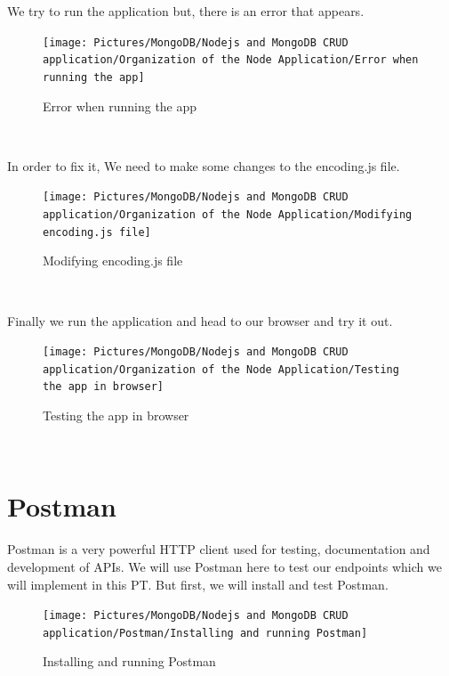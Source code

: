 \begin{spacing}{1.2}
\par We try to run the application but, there is an error that appears.
\\
\begin{figure}[!htb] 
\begin{center} 
\texttt{[image: Pictures/MongoDB/Nodejs and MongoDB CRUD  application/Organization of the Node Application/Error when running the app]} 
\end{center} 
\caption{Error when running the app} 
\end{figure}  \FloatBarrier
\\
\newpage
\par In order to fix it, We need to make some changes to the encoding.js file.
\\
\begin{figure}[!htb] 
\begin{center} 
\texttt{[image: Pictures/MongoDB/Nodejs and MongoDB CRUD  application/Organization of the Node Application/Modifying encoding.js file]} 
\end{center} 
\caption{Modifying encoding.js file} 
\end{figure}  \FloatBarrier
\\
\par Finally we run the application and head to our browser and try it out.
\\
\begin{figure}[!htb] 
\begin{center} 
\texttt{[image: Pictures/MongoDB/Nodejs and MongoDB CRUD  application/Organization of the Node Application/Testing the app in browser]} 
\end{center} 
\caption{Testing the app in browser} 
\end{figure}  \FloatBarrier
\\

\newpage
\section{Postman }
\par Postman is a very powerful HTTP client used for testing, documentation and development
of APIs. We will use Postman here to test our endpoints which we will implement in this
PT. But first, we will install and test Postman.

\begin{figure}[!htb] 
\begin{center} 
\texttt{[image: Pictures/MongoDB/Nodejs and MongoDB CRUD  application/Postman/Installing and running Postman]} 
\end{center} 
\caption{Installing and running Postman} 
\end{figure}  \FloatBarrier
\\


\end{spacing}
